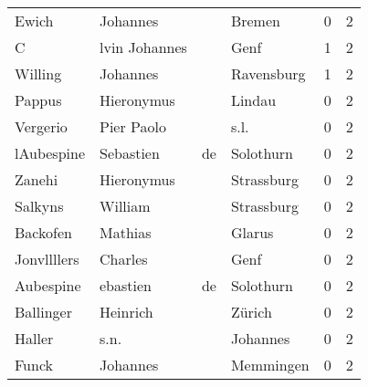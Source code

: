 \begin{center}
\begin{tiny}
\begin{longtabu}{llllrr}
                    Ewich &                           Johannes &             &                                      Bremen &          0 &         2 \\
                        C &                      lvin Johannes &             &                                        Genf &          1 &         2 \\
                  Willing &                           Johannes &             &                                  Ravensburg &          1 &         2 \\
                   Pappus &                         Hieronymus &             &                                      Lindau &          0 &         2 \\
                 Vergerio &                         Pier Paolo &             &                                        s.l. &          0 &         2 \\
               lAubespine &                          Sebastien &          de &                                   Solothurn &          0 &         2 \\
                   Zanehi &                         Hieronymus &             &                                  Strassburg &          0 &         2 \\
                  Salkyns &                            William &             &                                  Strassburg &          0 &         2 \\
                 Backofen &                            Mathias &             &                                      Glarus &          0 &         2 \\
              Jonvllllers &                            Charles &             &                                        Genf &          0 &         2 \\
                Aubespine &                           ebastien &          de &                                   Solothurn &          0 &         2 \\
                Ballinger &                           Heinrich &             &                                      Zürich &          0 &         2 \\
                   Haller &                               s.n. &             &                                    Johannes &          0 &         2 \\
                    Funck &                           Johannes &             &                                   Memmingen &          0 &         2 \\

\end{longtabu}
\end{tiny}
\end{center}
